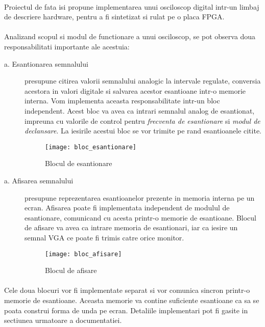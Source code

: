 \paragraph{}
Proiectul de fata isi propune implementarea unui osciloscop digital intr-un limbaj de descriere hardware, pentru a fi sintetizat si rulat pe o placa FPGA.

\paragraph{}
Analizand scopul si modul de functionare a unui osciloscop, se pot observa doua responsabilitati importante ale acestuia:

\begin{description}
	\item[a. Esantionarea semnalului]
		presupune citirea valorii semnalului analogic la intervale regulate, conversia acestora in valori digitale si salvarea acestor esantioane intr-o memorie interna. Vom implementa aceasta responsabilitate intr-un bloc independent. Acest bloc va avea ca intrari semnalul analog de esantionat, impreuna cu valorile de control pentru \emph{frecventa de esantionare} si \emph{modul de declansare}. La iesirile acestui bloc se vor trimite pe rand esantioanele citite.
		
\begin{figure}[h]
	\centering
	\texttt{[image: bloc\_esantionare]}
	\caption{Blocul de esantionare}
	\label{fig:bloc_esantionare}
\end{figure}		
		
	\item[a. Afisarea semnalului]		
		presupune reprezentarea esantioanelor prezente in memoria interna pe un ecran. Afisarea poate fi implementata independent de modulul de esantionare, comunicand cu acesta printr-o memorie de esantioane. Blocul de afisare va avea ca intrare memoria de esantionari, iar ca iesire un semnal VGA ce poate fi trimis catre orice monitor.
		
\begin{figure}[h]
	\centering
	\texttt{[image: bloc\_afisare]}
	\caption{Blocul de afisare}
	\label{fig:bloc_afisare}
\end{figure}		
\end{description}

\paragraph{}
Cele doua blocuri vor fi implementate separat si vor comunica sincron printr-o memorie de esantioane. Aceasta memorie va contine suficiente esantioane ca sa se poata construi forma de unda pe ecran. Detaliile implementari pot fi gasite in sectiunea urmatoare a documentatiei.



